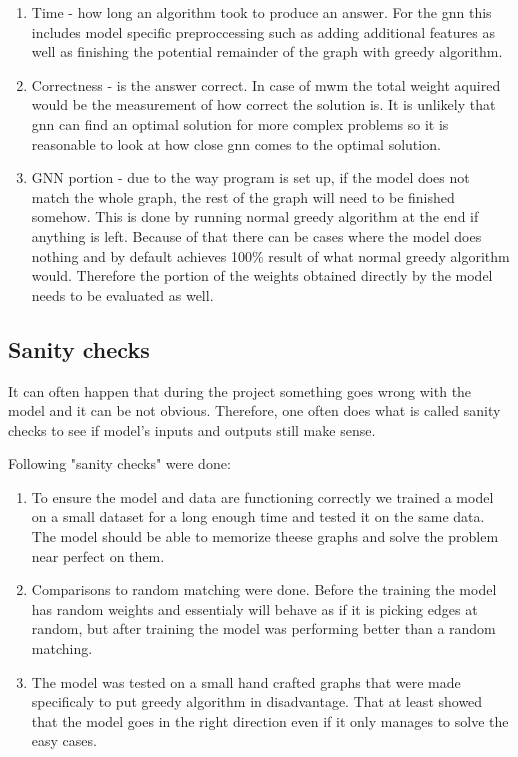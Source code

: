 \begin{enumerate}
\item Time - how long an algorithm took to produce an answer. For the \gls{gnn} this includes model specific preproccessing such as adding additional features as well as finishing the potential remainder of the graph with greedy algorithm.
\item Correctness - is the answer correct. In case of \gls{mwm} the total weight aquired would be the measurement of how correct the solution is. It is unlikely that \gls{gnn} can find an optimal solution for more complex problems so it is reasonable to look at how close \gls{gnn} comes to the optimal solution.
\item GNN portion - due to the way program is set up, if the model does not match the whole graph, the rest of the graph will need to be finished somehow. This is done by running normal greedy algorithm at the end if anything is left. Because of that there can be cases where the model does nothing and by default achieves 100\% result of what normal greedy algorithm would. Therefore the portion of the weights obtained directly by the model needs to be evaluated as well.
\end{enumerate}

\subsection{Sanity checks}

It can often happen that during the project something goes wrong with the model and it can be not obvious. Therefore, one often does what is called sanity checks to see if model's inputs and outputs still make sense. 

Following "sanity checks" were done:
	\begin{enumerate}

\item To ensure the model and data are functioning correctly we trained a model on a small dataset for a long enough time and tested it on the same data. The model should be able to memorize theese graphs and solve the problem near perfect on them.

\item Comparisons to random matching were done. Before the training the model has random weights and essentialy will behave as if it is picking edges at random, but after training the model was performing better than a random matching.

\item The model was tested on a small hand crafted graphs that were made specificaly to put greedy algorithm in disadvantage. That at least showed that the model goes in the right direction even if it only manages to solve the easy cases.
	\end{enumerate}	

